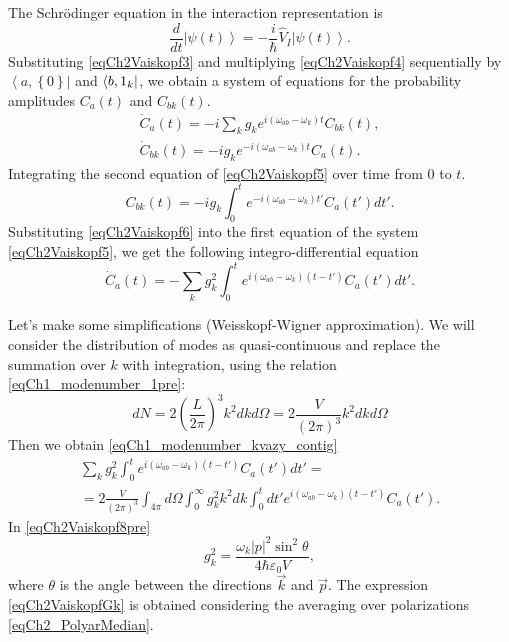 The Schrödinger equation in the interaction representation is
\begin{equation}
\frac{d}{dt} \left|\psi\left(t\right)\right> =
- \frac{i}{\hbar} \hat{V}_I \left|\psi\left(t\right)\right>.
\label{eqCh2Vaiskopf4}
\end{equation}
Substituting \eqref{eqCh2Vaiskopf3} and multiplying \eqref{eqCh2Vaiskopf4} sequentially by $\left<a, \left\{0\right\}\right|$ and $\bra{b, 1_k}$, we obtain a system of equations for the probability amplitudes $C_{a}\left(t\right)$ and $C_{bk}\left(t\right)$.
\begin{eqnarray}
\dot{C}_{a}\left(t\right) = - i \sum_{k} g_k e^{i \left(\omega_{ab} - 
  \omega_k\right)t} C_{bk}\left(t\right),
\nonumber \\
\dot{C}_{bk}\left(t\right) = - i g_k e^{- i \left(\omega_{ab} -
  \omega_k\right)t} C_{a}\left(t\right).
\label{eqCh2Vaiskopf5}
\end{eqnarray}
Integrating the second equation of \eqref{eqCh2Vaiskopf5} over time from $0$ to $t$. 
\begin{equation}
C_{bk}\left(t\right) = - i g_k \int_0^{t} e^{- i \left(\omega_{ab} -
  \omega_k\right)t'} C_{a}\left(t'\right) dt'.
\label{eqCh2Vaiskopf6}
\end{equation}
Substituting \eqref{eqCh2Vaiskopf6} into the first equation of the system \eqref{eqCh2Vaiskopf5}, we get the following integro-differential equation
\begin{equation}
\dot{C}_{a}\left(t\right) = - \sum_{k} g_k^2 
\int_0^t
e^{i \left(\omega_{ab} - \omega_k\right)\left(t - t'\right)}  
C_{a}\left(t'\right) dt'.
\label{eqCh2Vaiskopf7}
\end{equation}

Let's make some simplifications (Weisskopf-Wigner approximation). We will consider the distribution of modes as quasi-continuous and replace the summation over $k$ with integration, using the relation \eqref{eqCh1_modenumber_1pre}:
\begin{equation}
d N = 2 \left(\frac{L}{2 \pi} \right)^3 k^2 d k d \Omega = 
2 \frac{V}{\left(2 \pi\right)^3}  k^2 d k d \Omega
\nonumber
\end{equation}
Then we obtain \eqref{eqCh1_modenumber_kvazy_contig}
\begin{eqnarray}
\sum_{k} g_k^2 
\int_0^t
e^{i \left(\omega_{ab} - \omega_k\right)\left(t - t'\right)}  
C_{a}\left(t'\right) dt' = 
\nonumber \\
= 2 \frac{V}{\left(2 \pi\right)^3} \int_{4\pi}d \Omega \int_0^{\infty}
g_k^2 k^2 dk  \int_0^t dt'
e^{i \left(\omega_{ab} - \omega_k\right)\left(t - t'\right)}  
C_{a}\left(t'\right).
\label{eqCh2Vaiskopf8pre}
\end{eqnarray}
In \eqref{eqCh2Vaiskopf8pre} 
\begin{equation}
g_k^2 = \frac{\omega_k\left|p\right|^2 \sin^2 \theta}{4 \hbar
  \varepsilon_0 V},
\label{eqCh2VaiskopfGk}
\end{equation}
where $\theta$ is the angle between the directions $\vec{k}$ and $\vec{p}$.
The expression \eqref{eqCh2VaiskopfGk} is obtained considering the averaging over polarizations \eqref{eqCh2_PolyarMedian}.

